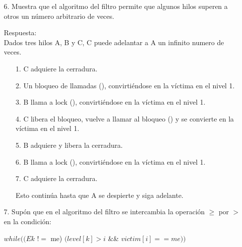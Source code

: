 \documentclass[12pt, letterpaper]{article}
\begin{document}
\begin{itemize}
\item[6. ]Muestra que el algoritmo del filtro permite que algunos hilos superen a otros
un número arbitrario de veces.

Respuesta: \\
Dados tres hilos A, B y C, C puede adelantar a A un infinito numero de veces.
\begin{itemize}


\item[1. ] C adquiere la cerradura.
\item[2. ] Un bloqueo de llamadas (), convirtiéndose en la víctima en el nivel 1.
\item[3. ] B llama a lock (), convirtiéndose en la víctima en el nivel 1.
\item[4. ] C libera el bloqueo, vuelve a llamar al bloqueo () y se convierte en la víctima en el nivel 1.
\item[5. ] B adquiere y libera la cerradura.
\item[6. ] B llama a lock (), convirtiéndose en la víctima en el nivel 1.
\item[7. ] C adquiere la cerradura.

Esto contin\'ua hasta que A se despierte y siga adelante.

\end{itemize}

\item[7. ]Sup\'on que en el algoritmo del filtro se intercambia la operaci\'on $ \geqslant$ por $>$ en la condici\'on:

\begin{center}
 $while((Ek$ $!=$ me) $(level[k] > i$ \&\& $victim[i] == me))$
\end{center}


\end{itemize}
\end{document}
